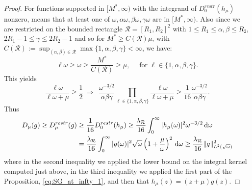 \documentclass[reqno,11pt,letterpaper]{amsart}
\numberwithin{equation}{section}
\newcommand{\dd}{\, {\rm d}}
\begin{document}
\begin{proof}
  For functions supported in $[M^*,\infty)$ with the integrand of $D_0^{restr}(h_\mu)$ nonzero, means that at least one of $\omega,\alpha\omega, \beta\omega, \gamma\omega $ are in $[M^*,\infty)$. Also since we are restricted on the bounded rectangle $\mathcal{R} =[R_1,R_2]^2$ with $1\leq R_1\leq \alpha, \beta \leq R_2$, $2R_1-1\leq \gamma\leq 2R_2-1$ and so for $M^* \geq C(\mathcal{R}) \mu$, with $C(\mathcal{R}):=\sup_{(\alpha, \beta) \in \mathcal{R} } 
  \max\{1,\alpha,\beta,\gamma\}<\infty$, we have:  
  $$ \ell\omega\geq \omega \geq \frac{M^*}{C(\mathcal{R})} \geq \mu, \quad \text{ for } \ell \in\{1,\alpha,\beta,\gamma\}.$$ This yields 
  $$\frac{\ell \omega}{\ell\omega+\mu} \geq \frac{1}{2} \ \Longrightarrow\  \ \frac{\omega^{-3/2}}{\alpha\beta\gamma}
    \prod_{\ell \in\{1,\alpha,\beta,\gamma\}}
    \frac{\ell \omega}{\ell\omega+\mu}\geq \frac{1}{16} \frac{\omega^{-3/2}}{\alpha\beta\gamma}. $$
    Thus
 \begin{equation}
     \begin{split}
         D_\mu (g) \geq D_\mu^{restr}(g)&\geq \frac{1}{16}D_0^{restr}(h_\mu)
  \geq \frac{\lambda_{\mathcal{R}}}{16} \int_0^\infty |h_\mu (\omega)|^2\omega^{-3/2} \dd \omega \\ & =  \frac{\lambda_{\mathcal{R}}}{16}\int_0^\infty
    |g(\omega)|^2\sqrt{\omega}
    \left(1+\frac{\mu}{\omega}\right)^2
    \dd \omega \geq \frac{\lambda_{\mathcal{R}}}{16} \|g\|_{L^2(\sqrt{\omega})}^2
     \end{split}
 \end{equation}
 where in the second inequality we applied the lower bound on the integral kernel computed just above, in the third inequality we applied the first part of the Proposition, \eqref{eq:SG_at_infty_1}, and then that $h_\mu(z)=(z+\mu)g(z)$. 
\end{proof}
\end{document}
